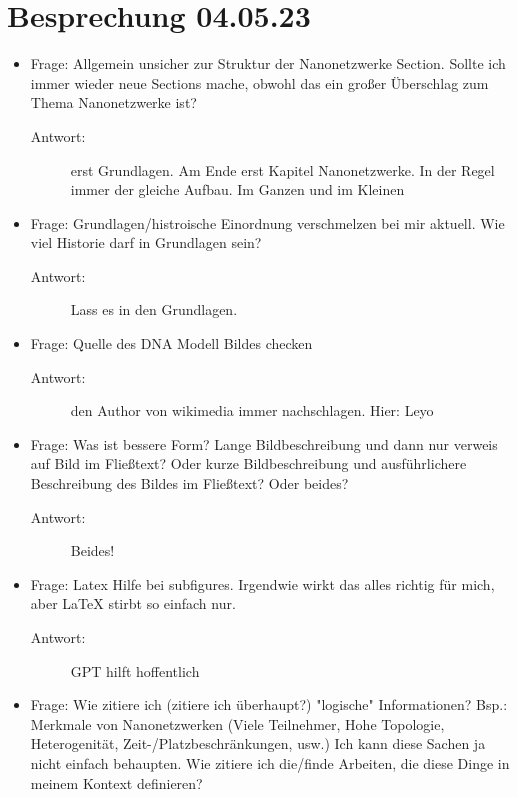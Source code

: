 \section{Besprechung 04.05.23}
  \begin{itemize}
    \item Frage: Allgemein unsicher zur Struktur der Nanonetzwerke Section. Sollte ich immer wieder neue Sections mache, obwohl das ein großer Überschlag zum Thema Nanonetzwerke ist?
    \begin{description}
      \item[Antwort:] erst Grundlagen. Am Ende erst Kapitel Nanonetzwerke. In der Regel immer der gleiche Aufbau. Im Ganzen und im Kleinen
    \end{description}
    \item Frage: Grundlagen/histroische Einordnung verschmelzen bei mir aktuell. Wie viel Historie darf in Grundlagen sein?
    \begin{description}
      \item[Antwort:] Lass es in den Grundlagen.
    \end{description}
    \item Frage: Quelle des DNA Modell Bildes checken
    \begin{description}
      \item[Antwort:] den Author von wikimedia immer nachschlagen. Hier: Leyo
    \end{description}
    \item Frage: Was ist bessere Form? Lange Bildbeschreibung und dann nur verweis auf Bild im Fließtext? Oder kurze Bildbeschreibung und ausführlichere Beschreibung des Bildes im Fließtext? Oder beides?
    \begin{description}
      \item[Antwort:] Beides!
    \end{description}
    \item Frage: Latex Hilfe bei subfigures. Irgendwie wirkt das alles richtig für mich, aber LaTeX stirbt so einfach nur. 
    \begin{description}
      \item[Antwort:] GPT hilft hoffentlich
    \end{description}
    \item Frage: Wie zitiere ich (zitiere ich überhaupt?) "logische" Informationen? Bsp.: Merkmale von Nanonetzwerken (Viele Teilnehmer, Hohe Topologie, Heterogenität, Zeit-/Platzbeschränkungen, usw.) Ich kann diese Sachen ja nicht einfach behaupten. Wie zitiere ich die/finde Arbeiten, die diese Dinge in meinem Kontext definieren?

\end{itemize}
